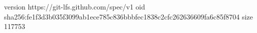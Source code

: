 version https://git-lfs.github.com/spec/v1
oid sha256:fe1f3d3b035f3099ab1ece785c836bbbfec1838c2cfc262636609fa6c85f8704
size 117753
